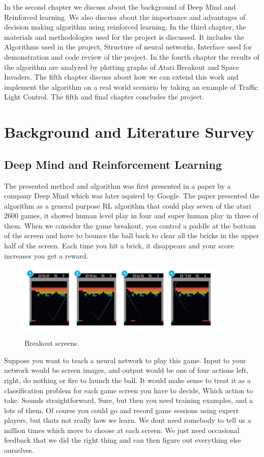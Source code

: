 \documentclass[a4paper,12pt]{report}
\begin{document}
			In the second chapter we discuss about the background of Deep Mind and Reinforced learning. We also discuss about the importance and advantages of decision making algorithm using reinforced learning. In the third chapter, the materials and methodologies used for the project is discussed. It includes the Algorithms used in the project, Structure of neural networks, Interface used for demonstration and code review of the project. In the fourth chapter the results of the algorithm are analyzed by plotting graphs of Atari Breakout and Space Invaders. The fifth chapter discuss about how we can extend this work and implement the algorithm on a real world scenario by taking an example of Traffic Light Control. The fifth and final chapter concludes the project.


	\chapter{Background and Literature Survey}
		\section{Deep Mind and Reinforcement Learning}

			The presented method and algorithm was first presented in a paper by a company Deep Mind which was later aquired by Google. The paper presented the algorithm as a general purpose RL algorithm that could play seven of the atari 2600 games, it showed human level play in four and super human play in three of them\cite{deepmind}.
			When we consider the game breakout, you control a paddle at the bottom of the screen and have to bounce the ball back to clear all the bricks in the upper half of the screen. Each time you hit a brick, it disappears and your score increases you get a reward.

			\begin{figure}[!ht]
				\begin{centering}
					\includegraphics[width=10cm]{../Design/images/breakout.png}\\
					\caption{Breakout screens.}
				\end{centering}
			\end{figure}
			Suppose you want to teach a neural network to play this game. Input to your network would be screen images, and output would be one of four actions left, right, do nothing or fire to launch the ball. It would make sense to treat it as a classification problem for each game screen you have to decide, Which action to take. Sounds straightforward, Sure, but then you need training examples, and a lots of them. Of course you could go and record game sessions using expert players, but thats not really how we learn. We dont need somebody to tell us a million times which move to choose at each screen. We just need occasional feedback that we did the right thing and can then figure out everything else ourselves.
\end{document}
